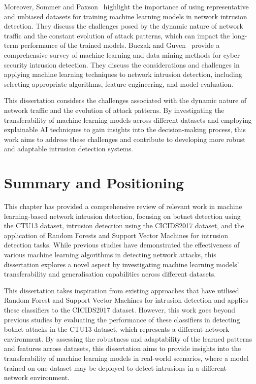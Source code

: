 Moreover, Sommer and Paxson~\cite{sommer2010outside} highlight the importance of using representative and unbiased datasets for training machine learning models in network intrusion detection. They discuss the challenges posed by the dynamic nature of network traffic and the constant evolution of attack patterns, which can impact the long-term performance of the trained models. Buczak and Guven~\cite{buczak2015survey} provide a comprehensive survey of machine learning and data mining methods for cyber security intrusion detection. They discuss the considerations and challenges in applying machine learning techniques to network intrusion detection, including selecting appropriate algorithms, feature engineering, and model evaluation.

This dissertation considers the challenges associated with the dynamic nature of network traffic and the evolution of attack patterns. By investigating the transferability of machine learning models across different datasets and employing explainable AI techniques to gain insights into the decision-making process, this work aims to address these challenges and contribute to developing more robust and adaptable intrusion detection systems.

\section{Summary and Positioning}

This chapter has provided a comprehensive review of relevant work in machine learning-based network intrusion detection, focusing on botnet detection using the CTU13 dataset, intrusion detection using the CICIDS2017 dataset, and the application of Random Forests and Support Vector Machines for intrusion detection tasks. While previous studies have demonstrated the effectiveness of various machine learning algorithms in detecting network attacks, this dissertation explores a novel aspect by investigating machine learning models’ transferability and generalisation capabilities across different datasets.

This dissertation takes inspiration from existing approaches that have utilised Random Forest and Support Vector Machines for intrusion detection and applies these classifiers to the CICIDS2017 dataset. However, this work goes beyond previous studies by evaluating the performance of these classifiers in detecting botnet attacks in the CTU13 dataset, which represents a different network environment. By assessing the robustness and adaptability of the learned patterns and features across datasets, this dissertation aims to provide insights into the transferability of machine learning models in real-world scenarios, where a model trained on one dataset may be deployed to detect intrusions in a different network environment.

